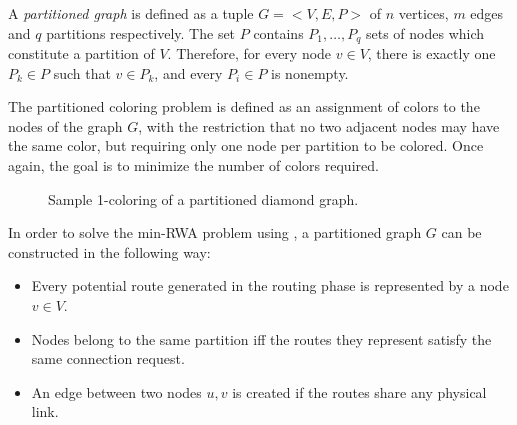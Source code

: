 A \textit{partitioned graph} is defined as a tuple $G = <V,E,P>$ of $n$ vertices, $m$ edges and $q$ partitions respectively. The set $P$ contains $P_1, \ldots ,P_q$ sets of nodes which constitute a partition of $V$. Therefore, for every node $v \in V$, there is exactly one $P_k \in P$ such that $v \in P_k$, and every $P_i \in P$ is nonempty.

The partitioned coloring problem is defined as an assignment of colors to the nodes of the graph $G$, with the restriction that no two adjacent nodes may have the same color, but requiring only one node per partition to be colored. Once again, the goal is to minimize the number of colors required.

\begin{figure}[h]
	\centering
\caption{Sample 1-coloring of a partitioned diamond graph.}
	\label{fig:samplepartitionedcoloring}
\end{figure}

In order to solve the min-RWA problem using \PCP{}, a partitioned graph $G$ can be constructed in the following way:
\begin{itemize}
\item{Every potential route generated in the routing phase is represented by a node $v \in V$.}
\item{Nodes belong to the same partition iff the routes they represent satisfy the same connection request.}
\item{An edge between two nodes $u,v$ is created if the routes share any physical link.}
\end{itemize}

